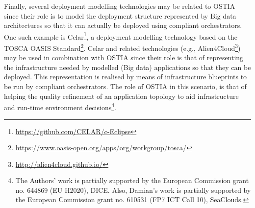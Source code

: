 Finally, several deployment modelling technologies may be related to OSTIA since their role is to model the deployment structure represented by Big data architectures so that it can actually be deployed using compliant orchestrators. One such example is Celar\footnote{\url{https://github.com/CELAR/c-Eclipse}}, a deployment modelling technology based on the TOSCA OASIS Standard\footnote{\url{https://www.oasis-open.org/apps/org/workgroup/tosca/}}. Celar and related technologies (e.g., Alien4Cloud\footnote{\url{http://alien4cloud.github.io/}}) may be used in combination with OSTIA since their role is that of representing the infrastructure needed by modelled (Big data) applications so that they can be deployed. This representation is realised by means of infrastructure blueprints to be run by compliant orchestrators. The role of OSTIA in this scenario, is that of helping the quality refinement of an application topology to aid infrastructure and run-time environment decisions\footnote{The Authors' work is partially supported by the European Commission grant no. 644869 (EU H2020), DICE. Also, Damian's work is partially supported by the European Commission grant no. 610531 (FP7 ICT Call 10), SeaClouds.}.


